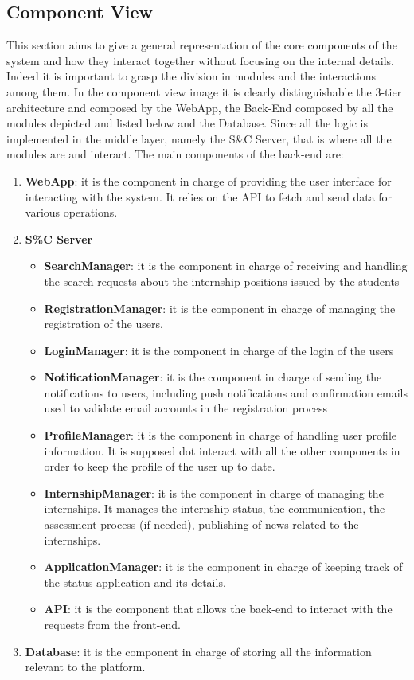 \subsection{Component View}
This section aims to give a general representation of the core components of the system and how they interact together without focusing on the internal details.
Indeed it is important to grasp the division in modules and the interactions among them. In the component view image it is clearly distinguishable the 3-tier architecture and composed by the WebApp, the Back-End composed by all the modules depicted and listed below and the Database. Since all the logic is implemented in the middle layer, namely the S\&C Server, that is where all the modules are and interact.
The main components of the back-end are:
\begin{enumerate}
    \item \textbf{WebApp}: it is the component in charge of providing the user interface for interacting with the system. It relies on the API to fetch and send data for various operations.
    \item \textbf{S\%C Server}
    \begin{itemize}
        \item \textbf{SearchManager}: it is the component in charge of receiving and handling the search requests about the internship positions issued by the students 
        \item \textbf{RegistrationManager}: it is the component in charge of managing the registration of the users.
        \item \textbf{LoginManager}: it is the component in charge of the login of the users
        \item \textbf{NotificationManager}: it is the component in charge of sending the notifications to users, including push notifications and confirmation emails used to validate email accounts in the registration process
        \item \textbf{ProfileManager}: it is the component in charge of handling user profile information. It is supposed dot interact with all the other components in order to keep the profile of the user up to date.
        \item \textbf{InternshipManager}: it is the component in charge of managing the internships. It manages the internship status, the communication, the assessment process (if needed), publishing of news related to the internships.
        \item \textbf{ApplicationManager}: it is the component in charge of keeping track of the status application and its details.
        \item \textbf{API}: it is the component that allows the back-end to interact with the requests from the front-end.
    \end{itemize}
    \item \textbf{Database}: it is the component in charge of storing all the information relevant to the platform.


\end{enumerate}
